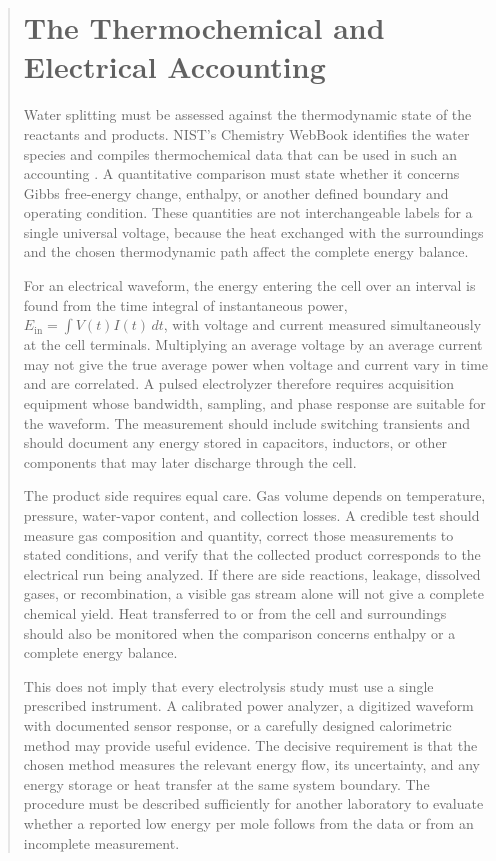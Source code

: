 \documentclass[11pt]{article}
\begin{document}
\begin{abstract}
\section{The Thermochemical and Electrical Accounting}

Water splitting must be assessed against the thermodynamic state of the reactants and products. NIST's Chemistry WebBook identifies the water species and compiles thermochemical data that can be used in such an accounting \cite{NISTWater}. A quantitative comparison must state whether it concerns Gibbs free-energy change, enthalpy, or another defined boundary and operating condition. These quantities are not interchangeable labels for a single universal voltage, because the heat exchanged with the surroundings and the chosen thermodynamic path affect the complete energy balance.

For an electrical waveform, the energy entering the cell over an interval is found from the time integral of instantaneous power, $E_{\mathrm{in}}=\int V(t)I(t)\,dt$, with voltage and current measured simultaneously at the cell terminals. Multiplying an average voltage by an average current may not give the true average power when voltage and current vary in time and are correlated. A pulsed electrolyzer therefore requires acquisition equipment whose bandwidth, sampling, and phase response are suitable for the waveform. The measurement should include switching transients and should document any energy stored in capacitors, inductors, or other components that may later discharge through the cell.

The product side requires equal care. Gas volume depends on temperature, pressure, water-vapor content, and collection losses. A credible test should measure gas composition and quantity, correct those measurements to stated conditions, and verify that the collected product corresponds to the electrical run being analyzed. If there are side reactions, leakage, dissolved gases, or recombination, a visible gas stream alone will not give a complete chemical yield. Heat transferred to or from the cell and surroundings should also be monitored when the comparison concerns enthalpy or a complete energy balance.

This does not imply that every electrolysis study must use a single prescribed instrument. A calibrated power analyzer, a digitized waveform with documented sensor response, or a carefully designed calorimetric method may provide useful evidence. The decisive requirement is that the chosen method measures the relevant energy flow, its uncertainty, and any energy storage or heat transfer at the same system boundary. The procedure must be described sufficiently for another laboratory to evaluate whether a reported low energy per mole follows from the data or from an incomplete measurement.


\end{abstract}
\end{document}

